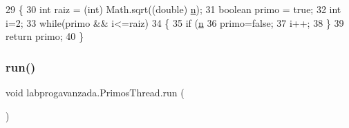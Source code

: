 \begin{DoxyCode}
29                                   \{
30         \textcolor{keywordtype}{int} raiz = (int) Math.sqrt((\textcolor{keywordtype}{double}) \mbox{\hyperlink{classlabprogavanzada_1_1_primos_thread_ae273c3f9736419431b182efcc4e1be3d}{n}});
31         \textcolor{keywordtype}{boolean} primo = \textcolor{keyword}{true};
32         \textcolor{keywordtype}{int} i=2;
33         \textcolor{keywordflow}{while}(primo && i<=raiz)
34         \{
35             \textcolor{keywordflow}{if} (\mbox{\hyperlink{classlabprogavanzada_1_1_primos_thread_ae273c3f9736419431b182efcc4e1be3d}{n}} %
36                 primo=\textcolor{keyword}{false};
37             i++;
38         \}
39         \textcolor{keywordflow}{return} primo;
40     \}
\end{DoxyCode}
\mbox{\label{classlabprogavanzada_1_1_primos_thread_a53e4273857bc2a928f7cd7edfcc320de}} 
\subsubsection{\texorpdfstring{run()}{run()}}
{\footnotesize\ttfamily void labprogavanzada.\+Primos\+Thread.\+run (\begin{DoxyParamCaption}{ }\end{DoxyParamCaption})\hspace{0.3cm}{\ttfamily [inline]}}


